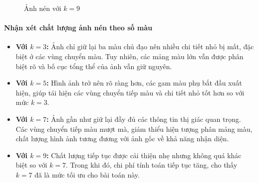 \begin{figure}[H]
  \centering
  \hfill
  \caption{Ảnh nén với \(k=9\)}
  \label{fig:k9}
\end{figure}

\newpage
\paragraph{Nhận xét chất lượng ảnh nén theo số màu}
\begin{itemize}
  \item \textbf{Với \(k=3\):} Ảnh chỉ giữ lại ba màu chủ đạo nên nhiều chi tiết nhỏ bị mất, đặc biệt ở các vùng chuyển màu. Tuy nhiên, các mảng màu lớn vẫn được phân biệt rõ và bố cục tổng thể của ảnh vẫn giữ nguyên.

  \item \textbf{Với \(k=5\):} Hình ảnh trở nên rõ ràng hơn, các gam màu phụ bắt đầu xuất hiện, giúp tái hiện các vùng chuyển tiếp màu và chi tiết nhỏ tốt hơn so với mức \(k=3\).

  \item \textbf{Với \(k=7\):} Ảnh gần như giữ lại đầy đủ các thông tin thị giác quan trọng. Các vùng chuyển tiếp màu mượt mà, giảm thiểu hiện tượng phân mảng màu, chất lượng hình ảnh tương đương với ảnh gốc về khả năng nhận diện.

  \item \textbf{Với \(k=9\):} Chất lượng tiếp tục được cải thiện nhẹ nhưng không quá khác biệt so với \(k=7\). Trong khi đó, chi phí tính toán tiếp tục tăng, cho thấy \(k=7\) đã là mức tối ưu cho bài toán này.
\end{itemize}


